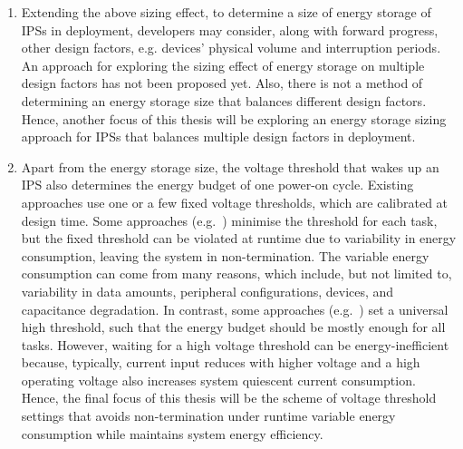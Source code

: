 \begin{enumerate}
\item 
Extending the above sizing effect, to determine a size of energy storage of IPSs in deployment, developers may consider, along with forward progress, other design factors, e.g. devices' physical volume and interruption periods. 
An approach for exploring the sizing effect of energy storage on multiple design factors has not been proposed yet. 
Also, there is not a method of determining an energy storage size that balances different design factors. 
Hence, another focus of this thesis will be exploring an energy storage sizing approach for IPSs that balances multiple design factors in deployment.  

\item 
Apart from the energy storage size, the voltage threshold that wakes up an IPS also determines the energy budget of one power-on cycle. 
Existing approaches use one or a few fixed voltage thresholds, which are calibrated at design time. 
Some approaches (e.g.~\cite{gomez2016dynamic}) minimise the threshold for each task, but the fixed threshold can be violated at runtime due to variability in energy consumption, leaving the system in non-termination. 
The variable energy consumption can come from many reasons, which include, but not limited to, variability in data amounts, peripheral configurations, devices, and capacitance degradation. 
In contrast, some approaches (e.g.~\cite{maeng2019supporting}) set a universal high threshold, such that the energy budget should be mostly enough for all tasks. 
However, waiting for a high voltage threshold can be energy-inefficient because, typically, current input reduces with higher voltage and a high operating voltage also increases system quiescent current consumption. 
Hence, the final focus of this thesis will be the scheme of voltage threshold settings that avoids non-termination under runtime variable energy consumption while maintains system energy efficiency. 

\end{enumerate}

